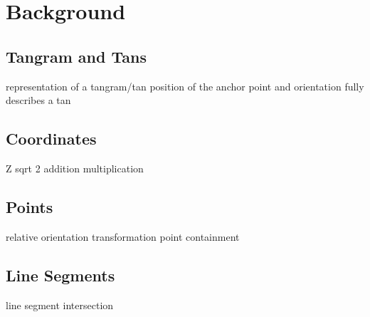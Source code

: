 \chapter{Background}\label{chapter:background}

\section{Tangram and Tans}
representation of a tangram/tan
position of the anchor point and orientation fully describes a tan

\section{Coordinates}
Z sqrt 2
addition 
multiplication
\section{Points}
relative orientation
transformation
point containment
\section{Line Segments}
line segment intersection
